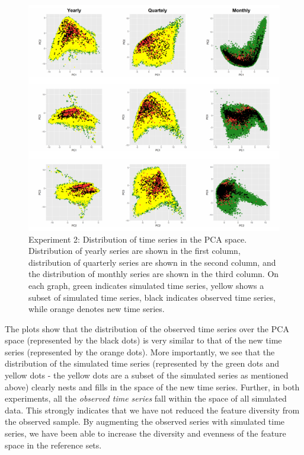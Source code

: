 \documentclass[11pt,a4paper,]{article}
\begin{document}
\begin{figure}

{\centering \includegraphics[width=\textwidth]{figure/exp2pca-1} 

}

\caption{Experiment 2: Distribution of time series in the PCA space. Distribution of yearly series are shown in the first column, distribution of quarterly series are shown in the second column, and the distribution of monthly series are shown in the third column. On each graph, green indicates simulated time series, yellow shows a subset of simulated time series, black indicates observed time series, while orange denotes new time series.}\label{fig:exp2pca}
\end{figure}

The plots show that the distribution of the observed time series over
the PCA space (represented by the black dots) is very similar to that of
the new time series (represented by the orange dots). More importantly,
we see that the distribution of the simulated time series (represented
by the green dots and yellow dots - the yellow dots are a subset of the
simulated series as mentioned above) clearly nests and fills in the
space of the new time series. Further, in both experiments, all the
\emph{observed time series} fall within the space of all simulated data.
This strongly indicates that we have not reduced the feature diversity
from the observed sample. By augmenting the observed series with
simulated time series, we have been able to increase the diversity and
evenness of the feature space in the reference sets.
\end{document}
